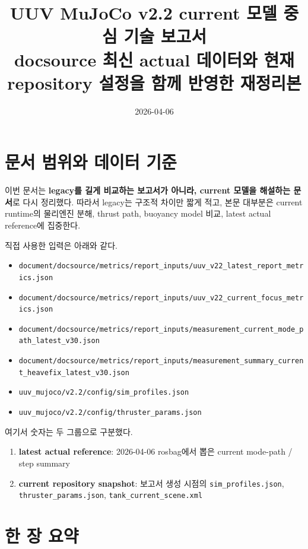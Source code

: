 \documentclass[11pt,a4paper]{article}
\title{UUV MuJoCo v2.2 current 모델 중심 기술 보고서\\
\large docsource 최신 actual 데이터와 현재 repository 설정을 함께 반영한 재정리본}
\author{}
\date{2026-04-06}
\newcommand{\code}[1]{\nolinkurl{#1}}
\begin{document}
\maketitle
\tableofcontents
\clearpage

\section{문서 범위와 데이터 기준}

이번 문서는 \textbf{legacy를 길게 비교하는 보고서가 아니라, current 모델을 해설하는 문서}로 다시 정리했다. 따라서 legacy는 구조적 차이만 짧게 적고, 본문 대부분은 current runtime의 물리엔진 분해, thrust path, buoyancy model 비교, latest actual reference에 집중한다.

직접 사용한 입력은 아래와 같다.

\begin{itemize}[leftmargin=2em]
  \item \code{document/docsource/metrics/report_inputs/uuv_v22_latest_report_metrics.json}
  \item \code{document/docsource/metrics/report_inputs/uuv_v22_current_focus_metrics.json}
  \item \code{document/docsource/metrics/report_inputs/measurement_current_mode_path_latest_v30.json}
  \item \code{document/docsource/metrics/report_inputs/measurement_summary_current_heavefix_latest_v30.json}
  \item \code{uuv_mujoco/v2.2/config/sim_profiles.json}
  \item \code{uuv_mujoco/v2.2/config/thruster_params.json}
\end{itemize}

여기서 숫자는 두 그룹으로 구분했다.

\begin{enumerate}[leftmargin=2em]
  \item \textbf{latest actual reference}: 2026-04-06 rosbag에서 뽑은 current mode-path / step summary
  \item \textbf{current repository snapshot}: 보고서 생성 시점의 \code{sim\_profiles.json}, \code{thruster\_params.json}, \code{tank\_current\_scene.xml}
\end{enumerate}

\section{한 장 요약}
\end{document}
